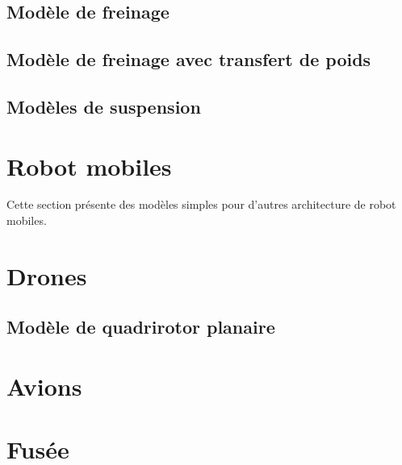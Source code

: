 \subsection{Modèle de freinage}




\subsection{Modèle de freinage avec transfert de poids}


\subsection{Modèles de suspension}






\newpage
\section{Robot mobiles}

Cette section présente des modèles simples pour d'autres architecture de robot mobiles.





\newpage
\section{Drones}

\subsection{Modèle de quadrirotor planaire}



\newpage
\section{Avions}



\newpage
\section{Fusée}
